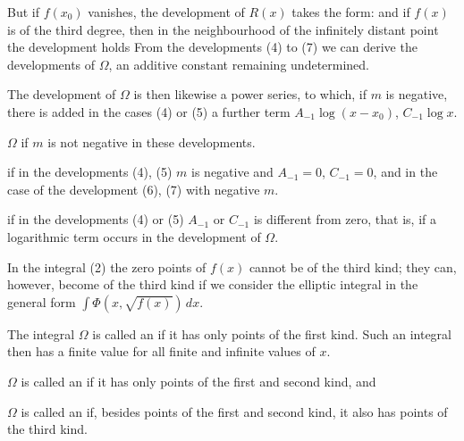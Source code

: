 But if $f(x_0)$ vanishes, the development of $R(x)$ takes the form:
and if $f(x)$ is of the third degree, then in the neighbourhood of the infinitely distant point the development holds
From the developments (4) to (7) we can derive the developments of $\Omega$, an additive constant remaining undetermined.

The development of $\Omega$ is then likewise a power series, to which, if $m$ is negative, there is added in the cases (4) or (5) a further term $A_{-1}\log(x-x_0)$, $C_{-1}\log x$.

 $\Omega$ if $m$ is not negative in these developments.


 if in the developments (4), (5) $m$ is negative and $A_{-1} = 0$, $C_{-1} = 0$, and in the case of the development (6), (7) with negative $m$.

 if in the developments (4) or (5) $A_{-1}$ or $C_{-1}$ is different from zero, that is, if a logarithmic term occurs in the development of $\Omega$.

In the integral (2) the zero points of $f(x)$ cannot be of the third kind; they can, however, become of the third kind if we consider the elliptic integral in the general form $\int \Phi(x, \sqrt{f(x)})\,dx$.

The integral $\Omega$ is called an  if it has only points of the first kind. Such an integral then has a finite value for all finite and infinite values of $x$.

$\Omega$ is called an  if it has only points of the first and second kind, and

$\Omega$ is called an  if, besides points of the first and second kind, it also has points of the third kind.
